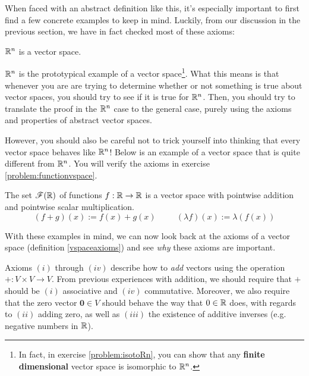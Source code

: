     
When faced with an abstract definition like this, it's especially important to first find a few concrete examples to keep in mind.  Luckily, from our discussion in the previous section, we have in fact checked most of these axioms:
    
    
    \begin{example}
    \vspace{-1em}
    \begin{theorem}
    $\mathbb{R}^n$ is a vector space.
    \end{theorem}
    \end{example}
    
    $\mathbb{R}^n$ is the prototypical example of a vector space\footnote{In fact, in exercise \ref{problem:isotoRn}, you can show that any \textbf{finite dimensional} vector space is isomorphic to $\mathbb{R}^n$.}.  What this means is that whenever you are are trying to determine whether or not something is true about vector spaces, you should try to see if it is true for $\mathbb{R}^n$.  Then, you should try to translate the proof in the $\mathbb{R}^n$ case to the general case, purely using the axioms and properties of abstract vector spaces.
    
    However, you should also be careful not to trick yourself into thinking that every vector space behaves like $\mathbb{R}^n$!  Below is an example of a vector space that is quite different from $\mathbb{R}^n$.  You will verify the axioms in exercise \ref{problem:functionvspace}.
    
    \begin{example}
    \vspace{-1em}
    \begin{theorem}\label{functionsvspace}
    The set $\mathscr{F}(\mathbb{R})$ of functions $f : \mathbb{R} \to \mathbb{R}$ is a vector space with pointwise addition and pointwise scalar multiplication.  $$(f + g)(x) := f(x) + g(x) \ \qquad \ (\lambda f)(x) := \lambda (f(x))$$
    \end{theorem}
    
    \end{example}

    With these examples in mind, we can now look back at the axioms of a vector space (definition \ref{vspaceaxioms}) and see \textit{why} these axioms are important.

    Axioms $(i)$ through $(iv)$ describe how to \textit{add} vectors using the operation $+ : V \times V \to V$.  From previous experiences with addition, we should require that $+$ should be $(i)$ associative and $(iv)$ commutative.  Moreover, we also require that the zero vector $\bm{0} \in V$ should behave the way that $0 \in \mathbb{R}$ does, with regards to $(ii)$ adding zero, as well as $(iii)$ the existence of additive inverses (e.g. negative numbers in $\mathbb{R}$).

